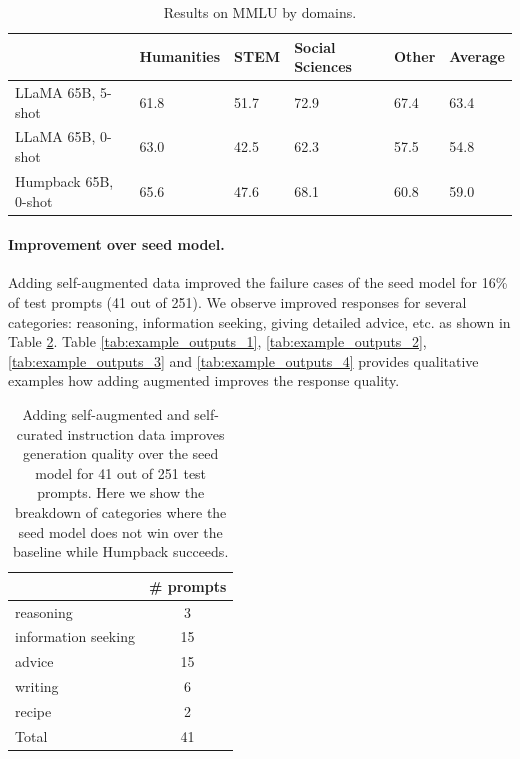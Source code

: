 \begin{table}[h]
  \caption{Results on MMLU by domains.}
  \label{tab:mmlu_eval}
  \centering
  \begin{tabular}{llllll}
    \toprule
        & \textbf{Humanities} & \textbf{STEM}  & \textbf{Social Sciences} & \textbf{Other} & \textbf{Average}  \\
    \midrule
    LLaMA 65B, 5-shot & 61.8 & 51.7 & 72.9 & 67.4 & 63.4     \\
    LLaMA 65B, 0-shot & 63.0 & 42.5 & 62.3 & 57.5 & 54.8       \\
    Humpback 65B, 0-shot & 65.6 & 47.6 & 68.1 & 60.8 & 59.0  \\ 
    \bottomrule
  \end{tabular}
  \vspace{1mm}

\end{table}


\paragraph{Improvement over seed model.} Adding self-augmented data improved the failure cases of the seed model for 16\% of test prompts (41 out of 251). We observe improved responses for several categories: reasoning, information seeking, giving detailed advice, etc. as shown in Table \ref{tab:improved_category}. Table \ref{tab:example_outputs_1}, \ref{tab:example_outputs_2}, \ref{tab:example_outputs_3} and \ref{tab:example_outputs_4} provides qualitative examples how adding augmented improves the response quality.  

\begin{table}[h]
    \caption{Adding self-augmented and self-curated  instruction data improves generation quality over the seed model for 41 out of 251 test prompts. Here we show the breakdown of categories where the seed model does not win over the baseline while Humpback succeeds.
      \label{tab:improved_category}
    }
  \centering
  \begin{tabular}{lc}
    \toprule
         &  \textbf{\# prompts}  \\
    \midrule
reasoning & 3 \\
information seeking & 15 \\
advice & 15 \\
writing & 6 \\
recipe & 2 \\
    \midrule
    Total & 41    \\
    \bottomrule
  \end{tabular}
\vspace{1mm}


\end{table}

